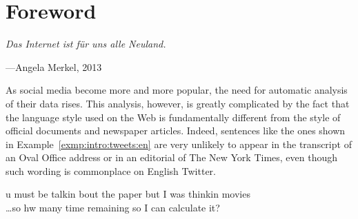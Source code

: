 

\chapter*{Foreword}

\hspace*{\fill}\epigraph{\itshape{}Das Internet ist f\"ur uns alle
  Neuland.}{---Angela Merkel, 2013}

As social media become more and more popular, the need for automatic
analysis of their data rises.  This analysis, however, is greatly
complicated by the fact that the language style used on the Web is
fundamentally different from the style of official documents and
newspaper articles.  Indeed, sentences like the ones shown in
Example~\ref{exmp:intro:tweets:en} \cite[provided by][]{HanBaldwin:11}
are very unlikely to appear in the transcript of an Oval Office
address or in an editorial of The New York Times, even though such
wording is commonplace on English Twitter.
\begin{example}\label{exmp:intro:tweets:en}
u must be talkin bout the paper but I was thinkin movies\\
\dots so hw many time remaining so I can calculate it?
\end{example}

